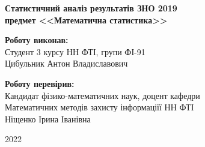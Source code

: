 \begin{titlepage}
    \begin{center}
        \begin{spacing}{1.5}
            \textbf{\Large{Статистичний аналіз результатів ЗНО 2019}} \\ 
            \vspace{1cm}\textbf{\large{предмет <<Математична статистика>>}}
        \end{spacing}
    \end{center}
    
    \vspace{\fill}
    
    \newlength{\maxname}

    \hfill\parbox{\maxname}{
        \begin{spacing}{1.1}
            \small{\textbf{Роботу виконав:}} \\ 
            \small{Студент 3 курсу НН ФТІ, групи ФІ-91} \\
            \small{Цибульник Антон Владиславович} \\
        \end{spacing}
    }

    \hfill\parbox{\maxname}{
        \begin{spacing}{1.1}
            \small{\textbf{Роботу перевірив:}} \\ 
            \small{Кандидат фізико-математичних наук, доцент кафедри} \\
            \small{Математичних методів захисту інформаціїї НН ФТІ} \\
            \small{Ніщенко Ірина Іванівна} \\
        \end{spacing}
    }

    \vspace{0.5cm}

    \begin{center}
        \small{2022}
    \end{center}
    
\end{titlepage}